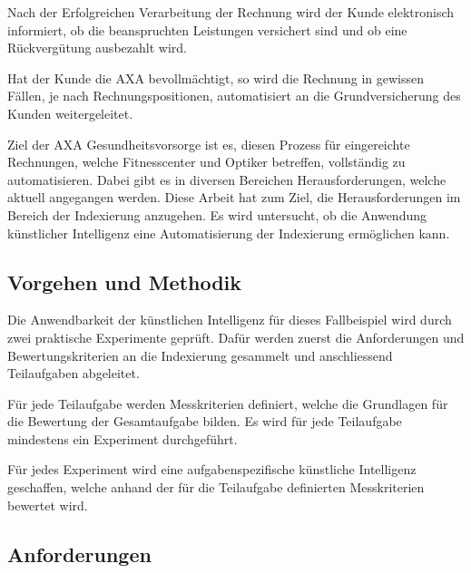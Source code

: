 Nach der Erfolgreichen Verarbeitung der Rechnung wird der Kunde elektronisch informiert, ob die beanspruchten Leistungen versichert sind und ob eine Rückvergütung ausbezahlt wird.

Hat der Kunde die AXA bevollmächtigt, so wird die Rechnung in gewissen Fällen, je nach Rechnungspositionen, automatisiert an die Grundversicherung des Kunden weitergeleitet. 

Ziel der AXA Gesundheitsvorsorge ist es, diesen Prozess für eingereichte Rechnungen, welche Fitnesscenter und Optiker betreffen, vollständig zu automatisieren. Dabei gibt es in diversen Bereichen Herausforderungen, welche aktuell angegangen werden. Diese Arbeit hat zum Ziel, die Herausforderungen im Bereich der Indexierung anzugehen. Es wird untersucht, ob die Anwendung künstlicher Intelligenz eine Automatisierung der Indexierung ermöglichen kann.




\subsection{Vorgehen und Methodik}


Die Anwendbarkeit der künstlichen Intelligenz für dieses Fallbeispiel wird durch zwei praktische Experimente geprüft. Dafür werden zuerst die Anforderungen und Bewertungskriterien an die Indexierung gesammelt und anschliessend Teilaufgaben abgeleitet. 

Für jede Teilaufgabe werden Messkriterien definiert, welche die Grundlagen für die Bewertung der Gesamtaufgabe bilden. Es wird für jede Teilaufgabe mindestens ein Experiment durchgeführt.

Für jedes Experiment wird eine aufgabenspezifische künstliche Intelligenz geschaffen, welche anhand der für die Teilaufgabe definierten Messkriterien bewertet wird.

\subsection{Anforderungen}

